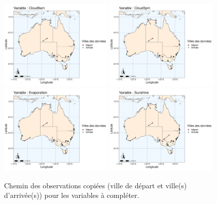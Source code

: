 \documentclass{article}
\begin{document}
\begin{figure}
    \centering
    \includegraphics[width=0.48\textwidth,page=1]{Ressources/Australia_map_segments_complete-1.jpg}
    \includegraphics[width=0.48\textwidth,page=2]{Ressources/Australia_map_segments_complete-2.jpg}
    \includegraphics[width=0.48\textwidth,page=3]{Ressources/Australia_map_segments_complete-3.jpg}
    \includegraphics[width=0.48\textwidth,page=4]{Ressources/Australia_map_segments_complete-4.jpg}
    \caption{Chemin des observations copiées (ville de départ et ville(s) d'arrivée(s)) pour les variables à compléter.}
\end{figure}
\end{document}
